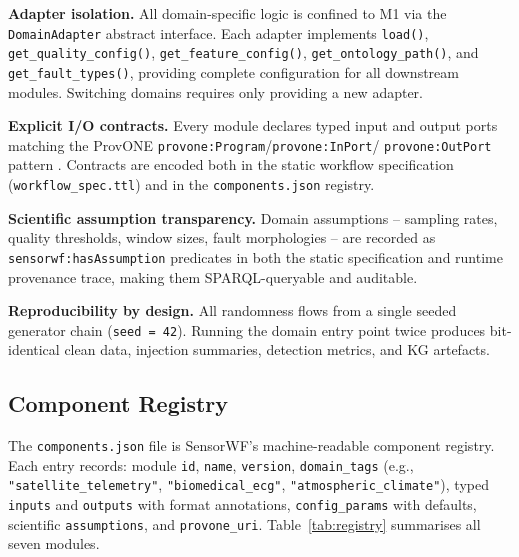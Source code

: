 \documentclass[conference]{IEEEtran}
\begin{document}
\textbf{Adapter isolation.} All domain-specific logic is confined to M1 via the
\texttt{DomainAdapter} abstract interface. Each adapter implements \texttt{load()},
\texttt{get\_quality\_config()}, \texttt{get\_feature\_config()},
\texttt{get\_ontology\_path()}, and \texttt{get\_fault\_types()}, providing
complete configuration for all downstream modules. Switching domains requires only
providing a new adapter.

\textbf{Explicit I/O contracts.} Every module declares typed input and output
ports matching the ProvONE \texttt{provone:Program}/\texttt{provone:InPort}/
\texttt{provone:OutPort} pattern \cite{missier2013provone}. Contracts are encoded
both in the static workflow specification (\texttt{workflow\_spec.ttl}) and in the
\texttt{components.json} registry.

\textbf{Scientific assumption transparency.} Domain assumptions -- sampling
rates, quality thresholds, window sizes, fault morphologies -- are recorded as
\texttt{sensorwf:hasAssumption} predicates in both the static specification and
runtime provenance trace, making them SPARQL-queryable and auditable.

\textbf{Reproducibility by design.} All randomness flows from a single seeded
generator chain (\texttt{seed = 42}). Running the domain entry point twice
produces bit-identical clean data, injection summaries, detection metrics, and
KG artefacts.

\subsection{Component Registry}

The \texttt{components.json} file is SensorWF's machine-readable component
registry. Each entry records: module \texttt{id}, \texttt{name},
\texttt{version}, \texttt{domain\_tags} (e.g., \texttt{"satellite\_telemetry"},
\texttt{"biomedical\_ecg"}, \texttt{"atmospheric\_climate"}), typed \texttt{inputs}
and \texttt{outputs} with format annotations, \texttt{config\_params} with defaults,
scientific \texttt{assumptions}, and \texttt{provone\_uri}. Table~\ref{tab:registry}
summarises all seven modules.
\end{document}
